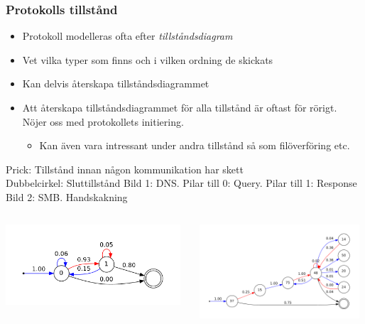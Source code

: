 \documentclass[xetex, 8pt]{beamer}
\begin{document}
    \begin{frame}
        \frametitle{Protokolls tillstånd}
        \begin{itemize}
            \item Protokoll modelleras ofta efter \emph{tillståndsdiagram}
            \item Vet vilka typer som finns och i vilken ordning de skickats
            \item Kan delvis återskapa tillståndsdiagrammet
            \item Att återskapa tillståndsdiagrammet för alla tillstånd är
                oftast för rörigt. Nöjer oss med protokollets initiering.
                \begin{itemize}
                    \item Kan även vara intressant under andra tillstånd så
                        som filöverföring etc.
                \end{itemize}
        \end{itemize}
        Prick: Tillstånd innan någon kommunikation har skett\\
        Dubbelcirkel: Sluttillstånd
        \vskip10pt
        Bild 1: DNS. Pilar till 0: Query. Pilar till 1: Response
        \vskip10pt
        Bild 2: SMB. Handskakning
        \begin{columns}[t]
            \begin{column}[T]{5cm}
                \includegraphics[height=3cm]{img/dnsstate.pdf}
            \end{column}
            \begin{column}[T]{6cm}
                \includegraphics[height=3.5cm]{img/smbstate.pdf}
            \end{column}
        \end{columns}

    \end{frame}
\end{document}
